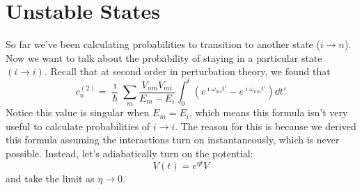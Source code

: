 \documentclass[a4paper,twoside,master.tex]{subfiles}
\begin{document}
\section{Unstable States}
\label{sec:unstable_states}

So far we've been calculating probabilities to transition to another state ($ i \to n $). Now we want to talk about the probability of staying in a particular state $ (i \to i) $. Recall that at second order in perturbation theory, we found that
\begin{equation}
    c_n^{(2)} = \frac{\imath}{\hbar} \sum_m \frac{V_{nm} V_{mi}}{E_m - E_i} \int_0^t \left( e^{\imath \omega_{mi} t'} - e^{\imath \omega_{nm} t'} \right) \dd{t'}
\end{equation}
Notice this value is singular when $ E_m = E_i $, which means this formula isn't very useful to calculate probabilities of $ i \to i $. The reason for this is because we derived this formula assuming the interactions turn on instantaneously, which is never possible. Instead, let's adiabatically turn on the potential:
\begin{equation}
    V(t) = e^{\eta t} V
\end{equation}
and take the limit as $ \eta \to 0 $.
\end{document}
